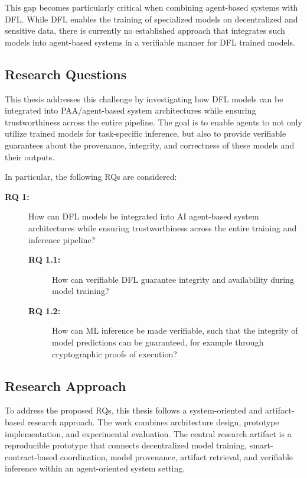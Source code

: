 This gap becomes particularly critical when combining agent-based systems with \ac{DFL}. While \ac{DFL} enables the training of specialized models on decentralized and sensitive data, there is currently no established approach that integrates such models into agent-based systems in a verifiable manner for \ac{DFL} trained models.

\subsection{Research Questions}

This thesis addresses this challenge by investigating how \ac{DFL} models can be integrated into \ac{PAA}/agent-based system architectures while ensuring trustworthiness across the entire pipeline. The goal is to enable agents to not only utilize trained models for task-specific inference, but also to provide verifiable guarantees about the provenance, integrity, and correctness of these models and their outputs.

In particular, the following \acp{RQ} are considered:

\begin{description}
    \item[\textbf{\ac{RQ} 1:}] How can \ac{DFL} models be integrated into \ac{AI} agent-based system architectures while ensuring trustworthiness across the entire training and inference pipeline?

    \begin{description}
        \item[\textbf{\ac{RQ} 1.1:}] How can verifiable \ac{DFL} guarantee integrity and availability during model training?
        
        \item[\textbf{\ac{RQ} 1.2:}] How can \ac{ML} inference be made verifiable, such that the integrity of model predictions can be guaranteed, for example through cryptographic proofs of execution?
    \end{description}
\end{description}

\subsection{Research Approach}

To address the proposed \acp{RQ}, this thesis follows a system-oriented and artifact-based research approach. The work combines architecture design, prototype implementation, and experimental evaluation. The central research artifact is a reproducible prototype that connects decentralized model training, smart-contract-based coordination, model provenance, artifact retrieval, and verifiable inference within an agent-oriented system setting.

